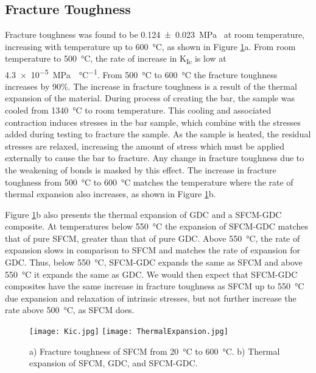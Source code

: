     \subsection{Fracture Toughness}
        Fracture toughness was found to be \SI[separate-uncertainty = true]{0.124 +- 0.023}{\mega\pascal{}} at room temperature, increasing with temperature up to \SI{600}{\celsius}, as shown in Figure \ref{fig:Kic}a.
        From room temperature to \SI{500}{\celsius}, the rate of increase in K\textsubscript{Ic} is low at \SI{4.3e-5}{\mega\pascal{}\per\celsius}.
        From \SI{500}{\celsius} to \SI{600}{\celsius} the fracture toughness increases by 90\%.
        The increase in fracture toughness is a result of the thermal expansion of the material.
        During process of creating the bar, the sample was cooled from \SI{1340}{\celsius} to room temperature.
        This cooling and associated contraction induces stresses in the bar sample, which combine with the stresses added during testing to fracture the sample.
        As the sample is heated, the residual stresses are relaxed, increasing the amount of stress which must be applied externally to cause the bar to fracture.
        Any change in fracture toughness due to the weakening of bonds is masked by this effect.
        The increase in fracture toughness from \SI{500}{\celsius} to \SI{600}{\celsius} matches the temperature where the rate of thermal expansion also increases, as shown in Figure \ref{fig:Kic}b.

        Figure \ref{fig:Kic}b also presents the thermal expansion of GDC and a SFCM-GDC composite.
        At temperatures below \SI{550}{\celsius} the expansion of SFCM-GDC matches that of pure SFCM, greater than that of pure GDC.
        Above \SI{550}{\celsius}, the rate of expansion slows in comparison to SFCM and matches the rate of expansion for GDC.
        Thus, below \SI{550}{\celsius}, SFCM-GDC expands the same as SFCM and above \SI{550}{\celsius} it expands the same as GDC.
        We would then expect that SFCM-GDC composites have the same increase in fracture toughness as SFCM up to \SI{550}{\celsius} due expansion and relaxation of intrinsic stresses, but not further increase the rate above \SI{500}{\celsius}, as SFCM does.

        \begin{figure}
            \texttt{[image: Kic.jpg]}
          \texttt{[image: ThermalExpansion.jpg]}
          \caption{a) Fracture toughness of SFCM from \SI{20}{\celsius} to \SI{600}{\celsius}. b) Thermal expansion of SFCM, GDC, and SFCM-GDC.}
          \label{fig:Kic}
        \end{figure}

